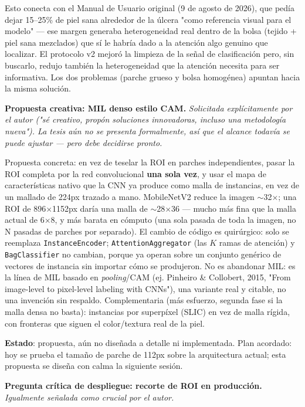 \documentclass[12pt,letterpaper]{report}
\newcommand{\entrada}[2]{%
    \vspace{0.6em}
    \noindent\textbf{#1.} \textit{#2}
    \vspace{0.3em}
    \par
}
\begin{document}
Esto conecta con el Manual de Usuario original (9 de agosto de 2026), que pedía dejar 15--25\% de
piel sana alrededor de la úlcera "como referencia visual para el modelo" --- ese margen generaba
heterogeneidad real dentro de la bolsa (tejido + piel sana mezclados) que sí le habría dado a la
atención algo genuino que localizar. El protocolo v2 mejoró la limpieza de la señal de clasificación
pero, sin buscarlo, redujo también la heterogeneidad que la atención necesita para ser informativa.
Los dos problemas (parche grueso y bolsa homogénea) apuntan hacia la misma solución.

\entrada{Propuesta creativa: MIL denso estilo CAM}{Solicitada explícitamente por el autor ("sé
creativo, propón soluciones innovadoras, incluso una metodología nueva"). La tesis aún no se
presenta formalmente, así que el alcance todavía se puede ajustar --- pero debe decidirse pronto.}

Propuesta concreta: en vez de teselar la ROI en parches independientes, pasar la ROI completa por
la red convolucional \textbf{una sola vez}, y usar el mapa de características nativo que la CNN ya
produce como malla de instancias, en vez de un mallado de 224px trazado a mano. MobileNetV2 reduce
la imagen $\sim$32$\times$; una ROI de 896$\times$1152px daría una malla de $\sim$28$\times$36 ---
mucho más fina que la malla actual de 6$\times$8, y más barata en cómputo (una sola pasada de toda
la imagen, no N pasadas de parches por separado). El cambio de código es quirúrgico: solo se
reemplaza \texttt{InstanceEncoder}; \texttt{AttentionAggregator} (las $K$ ramas de atención) y
\texttt{BagClassifier} no cambian, porque ya operan sobre un conjunto genérico de vectores de
instancia sin importar cómo se produjeron. No es abandonar MIL: es la línea de MIL basado en
\emph{pooling}/CAM (ej. Pinheiro \& Collobert, 2015, "From image-level to pixel-level labeling with
CNNs"), una variante real y citable, no una invención sin respaldo. Complementaria (más esfuerzo,
segunda fase si la malla densa no basta): instancias por superpíxel (SLIC) en vez de malla rígida,
con fronteras que siguen el color/textura real de la piel.

\textbf{Estado}: propuesta, aún no diseñada a detalle ni implementada. Plan acordado: hoy se prueba
el tamaño de parche de 112px sobre la arquitectura actual; esta propuesta se diseña con calma la
siguiente sesión.

\entrada{Pregunta crítica de despliegue: recorte de ROI en producción}{Igualmente señalada como
crucial por el autor.}
\end{document}
